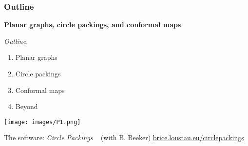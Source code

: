   
\begin{frame}
\frametitle{Outline}
    
\begin{center}
{\large \bfseries Planar graphs, circle packings, and conformal maps}
\end{center}
    

\bigskip \bigskip

\begin{minipage}{0.40\textwidth}

\emph{Outline.}
\bigskip

\begin{enumerate}[1., itemsep=1.0ex]
\item Planar graphs
\item Circle packings
\item Conformal maps
\item Beyond
\end{enumerate}
\end{minipage}%
\hfill \pause
\begin{minipage}{0.60\textwidth}

\begin{center}
\texttt{[image: images/P1.png]}
\end{center}

The software: \emph{Circle Packings} ~ (with B. Beeker) \newline
\href{https://www.brice.loustau.eu/circlepackings/indexen.html}{brice.loustau.eu/circlepackings} \newline


\end{minipage}%



\end{frame}

